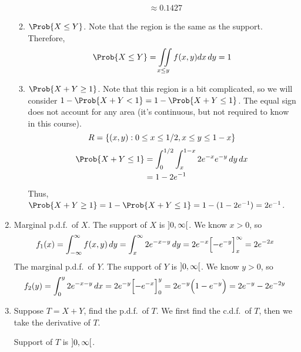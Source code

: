 \begin{Example}{}{}
\begin{enumerate}[label=(\roman*)]
\begin{enumerate}[label=(\alph*)]
\begin{align*}
                             & \approx 0.1427
                        \end{align*}
                  \item $ \Prob{X\le Y} $. Note that the region
                        is the same as the support. Therefore,
                        \[ \Prob{X\le Y}
                            =\iint\limits_{x\le y}f(x,y)dx\,dy=1 \]
                  \item $ \Prob{X+Y\ge 1} $. Note that this region is a
                        bit complicated, so we will consider $ 1-\Prob{X+Y<1}
                            =1-\Prob{X+Y\le 1} $.
                        The equal sign does not account for any area (it's continuous,
                        but not required to know in this course).
                        \[ R=\{(x,y):0\le x\le 1/2,x\le y\le 1-x\} \]
                        \begin{align*}
                            \Prob{X+Y\le 1}
                             & =\int_{0}^{1/2} \int_{x}^{1-x} 2e^{-x}e^{-y}\, d{y} \, d{x} \\
                             & =1-2e^{-1}
                        \end{align*}
                        Thus, $ \Prob{X+Y\ge 1}
                            =1-\Prob{X+Y\le 1}
                            =1-(1-2e^{-1})=2e^{-1} $.
              \end{enumerate}
        \item Marginal p.d.f.\ of $ X $. The support of $ X $ is
              $ \interval[open]{0}{\infty} $. We know $ x>0 $, so
              \[ f_1(x)=
                  \int_{-\infty}^{\infty} f(x,y)\, d{y}
                  =\int_{x}^{\infty} 2e^{-x-y}\, d{y}
                  =2e^{-x}\Bigl[ -e^{-y} \Bigr]_x^\infty=2e^{-2x} \]
              The marginal p.d.f.\ of $ Y $. The support of $ Y $ is
              $ \interval[open]{0}{\infty} $. We know $ y>0 $, so
              \[ f_2(y)=
                  \int_{0}^{y}2e^{-x-y}\, d{x} =
                  2e^{-y}\Bigl[ -e^{-x} \Bigr]_0^y
                  =2e^{-y}\Bigl( 1-e^{-y} \Bigr)=
                  2e^{-y}-2e^{-2y} \]
        \item Suppose $ T=X+Y $, find the p.d.f.\ of $ T $.
              We first find the c.d.f.\ of $ T $, then we take the derivative
              of $ T $.

              Support of $ T $ is $ \interval[open]{0}{\infty} $.


\end{enumerate}
\end{Example}
